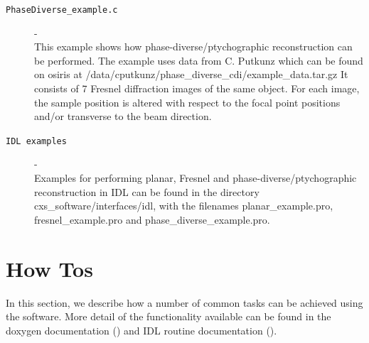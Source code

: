 \documentclass[]{cxs-software}
\begin{document}
\begin{description}
\item[{\tt PhaseDiverse\_example.c }]- \\ This example shows how
  phase-diverse/ptychographic reconstruction can be performed. The
  example uses data from C. Putkunz which can be found on osiris at
  /data/cputkunz/phase\_diverse\_cdi/example\_data.tar.gz It consists
  of 7 Fresnel diffraction images of the same object.  For each image,
  the sample position is altered with respect to the focal point
  positions and/or transverse to the beam direction.

\item[{\tt IDL examples}] - \\ Examples for performing planar, Fresnel
  and phase-diverse/ptychographic reconstruction in IDL can be found
  in the directory cxs\_software/interfaces/idl, with the filenames
  planar\_example.pro, fresnel\_example.pro and
  phase\_diverse\_example.pro.

\end{description}


\newpage

\section{How Tos}
\label{how to}

In this section, we describe how a number of common tasks can be
achieved using the software. More detail of the functionality
available can be found in the doxygen documentation () and IDL routine
documentation (). 
\end{document}

